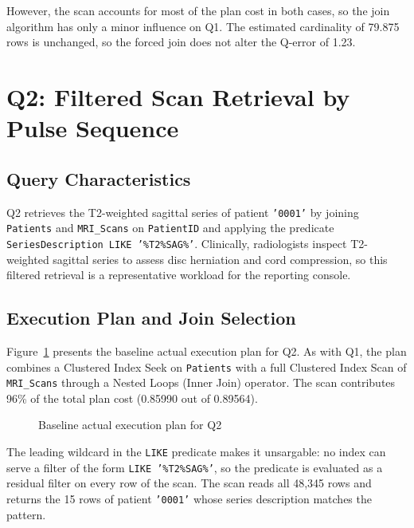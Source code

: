 However, the scan accounts for most of the plan cost in both cases, so the join algorithm has only a minor influence on Q1. The estimated cardinality of 79.875 rows is unchanged, so the forced join does not alter the Q-error of 1.23.


\section{Q2: Filtered Scan Retrieval by Pulse Sequence}

\subsection{Query Characteristics}

Q2 retrieves the T2-weighted sagittal series of patient \texttt{'0001'} by joining \texttt{Patients} and \texttt{MRI\_Scans} on \texttt{PatientID} and applying the predicate \texttt{SeriesDescription LIKE '\%T2\%SAG\%'}. Clinically, radiologists inspect T2-weighted sagittal series to assess disc herniation and cord compression, so this filtered retrieval is a representative workload for the reporting console.

\subsection{Execution Plan and Join Selection}

Figure~\ref{fig:q2-plan} presents the baseline actual execution plan for Q2. As with Q1, the plan combines a Clustered Index Seek on \texttt{Patients} with a full Clustered Index Scan of \texttt{MRI\_Scans} through a Nested Loops (Inner Join) operator. The scan contributes 96\% of the total plan cost (0.85990 out of 0.89564).

\begin{figure}[htbp]
\centering
{}
\caption{Baseline actual execution plan for Q2}
\label{fig:q2-plan}
\end{figure}

The leading wildcard in the \texttt{LIKE} predicate makes it unsargable: no index can serve a filter of the form \texttt{LIKE '\%T2\%SAG\%'}, so the predicate is evaluated as a residual filter on every row of the scan. The scan reads all 48,345 rows and returns the 15 rows of patient \texttt{'0001'} whose series description matches the pattern.

